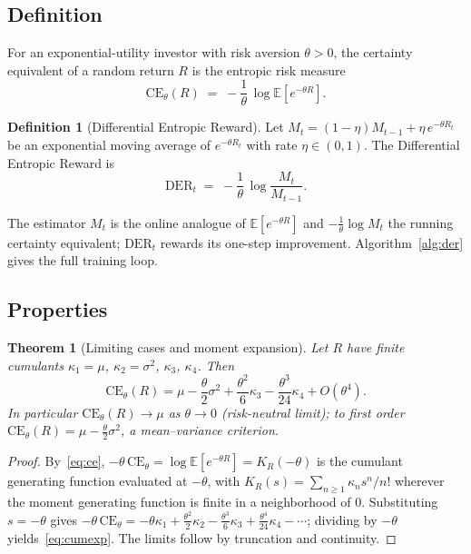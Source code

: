 \documentclass[11pt]{article}
\newtheorem{theorem}{Theorem}
\theoremstyle{definition}
\newtheorem{definition}{Definition}
\newcommand{\E}{\mathbb{E}}
\newcommand{\CE}{\mathrm{CE}}
\newcommand{\DER}{\mathrm{DER}}
\begin{document}
\subsection{Definition}

For an exponential-utility investor with risk aversion $\theta>0$, the certainty
equivalent of a random return $R$ is the entropic risk measure~\cite{follmer2002}
\begin{equation}
\CE_\theta(R) \;=\; -\frac{1}{\theta}\,\log \E\!\left[e^{-\theta R}\right].
\label{eq:ce}
\end{equation}

\begin{definition}[Differential Entropic Reward]
Let $M_t=(1-\eta)M_{t-1}+\eta\,e^{-\theta R_t}$ be an exponential moving average of
$e^{-\theta R_t}$ with rate $\eta\in(0,1)$. The Differential Entropic Reward is
\begin{equation}
\DER_t \;=\; -\frac{1}{\theta}\,\log\frac{M_t}{M_{t-1}} .
\label{eq:der}
\end{equation}
\end{definition}

The estimator $M_t$ is the online analogue of $\E[e^{-\theta R}]$ and $-\tfrac1\theta\log M_t$
the running certainty equivalent; $\DER_t$ rewards its one-step improvement.
Algorithm~\ref{alg:der} gives the full training loop.

\subsection{Properties}

\begin{theorem}[Limiting cases and moment expansion]\label{thm:expansion}
Let $R$ have finite cumulants $\kappa_1=\mu$, $\kappa_2=\sigma^2$, $\kappa_3$,
$\kappa_4$. Then
\begin{equation}
\CE_\theta(R)
=\mu-\frac{\theta}{2}\sigma^2+\frac{\theta^2}{6}\kappa_3-\frac{\theta^3}{24}\kappa_4+O(\theta^4).
\label{eq:cumexp}
\end{equation}
In particular $\CE_\theta(R)\to\mu$ as $\theta\to0$ (risk-neutral limit); to first
order $\CE_\theta(R)=\mu-\tfrac{\theta}{2}\sigma^2$, a mean--variance criterion.
\end{theorem}
\begin{proof}
By~\eqref{eq:ce}, $-\theta\,\CE_\theta=\log\E[e^{-\theta R}]=K_R(-\theta)$ is the
cumulant generating function evaluated at $-\theta$, with
$K_R(s)=\sum_{n\ge1}\kappa_n s^n/n!$ wherever the moment generating function is finite
in a neighborhood of $0$. Substituting $s=-\theta$ gives
$-\theta\,\CE_\theta=-\theta\kappa_1+\tfrac{\theta^2}{2}\kappa_2-\tfrac{\theta^3}{6}\kappa_3+\tfrac{\theta^4}{24}\kappa_4-\cdots$;
dividing by $-\theta$ yields~\eqref{eq:cumexp}. The limits follow by truncation and
continuity.
\end{proof}
\end{document}

